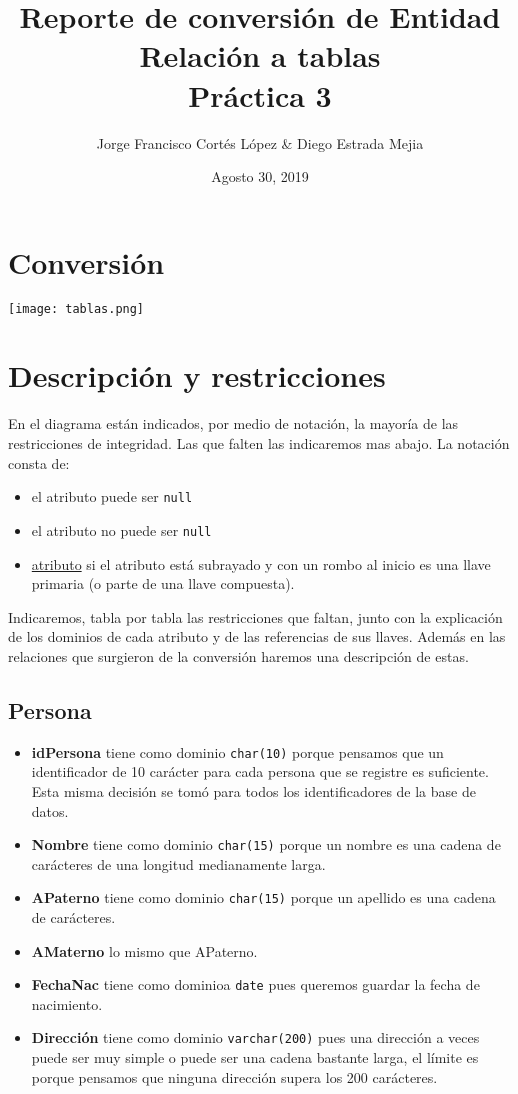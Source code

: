 \documentclass[11pt]{article}
\author{Jorge Francisco Cortés López & Diego Estrada Mejia}
\date{Agosto 30, 2019}
\title{Reporte de conversión de Entidad Relación a tablas\\
  Práctica 3}
\begin{document}
\maketitle

\section*{Conversión}
\label{sec:orgd2f6e52}
\begin{center}
\texttt{[image: tablas.png]}
\end{center}
\section*{Descripción y restricciones}
\label{sec:orge9cb773}
En el diagrama están indicados, por medio de notación, la mayoría de las restricciones
de integridad. Las que falten las indicaremos mas abajo. La notación consta de:
\begin{itemize}
\item \textdegree{} el atributo puede ser \texttt{null}
\item \textbullet{} el atributo no puede ser \texttt{null}
\item \uline{atributo} si el atributo está subrayado y con un rombo al inicio es una llave primaria 
(o parte de una llave compuesta).
\end{itemize}
Indicaremos, tabla por tabla las restricciones que faltan, junto con la explicación de los dominios
de cada atributo y de las referencias de sus llaves. Además en las relaciones que
surgieron de la conversión haremos una descripción de estas.
\subsection*{Persona}
\label{sec:org247eb51}
\begin{itemize}
\item \textbf{idPersona} tiene como dominio \texttt{char(10)} porque pensamos que un identificador de 10 carácter para cada persona
que se registre es suficiente. Esta misma decisión se tomó para todos los identificadores de la base de 
datos.
\item \textbf{Nombre} tiene como dominio \texttt{char(15)} porque un nombre es una cadena de carácteres de una longitud medianamente larga.
\item \textbf{APaterno} tiene como dominio \texttt{char(15)} porque un apellido es una cadena de carácteres.
\item \textbf{AMaterno} lo mismo que APaterno.
\item \textbf{FechaNac} tiene como dominioa \texttt{date} pues queremos guardar la fecha de nacimiento.
\item \textbf{Dirección} tiene como dominio \texttt{varchar(200)} pues una dirección a veces puede ser muy simple o puede ser una cadena
bastante larga, el límite es porque pensamos que ninguna dirección supera los 200 carácteres.
\end{itemize}
\end{document}
